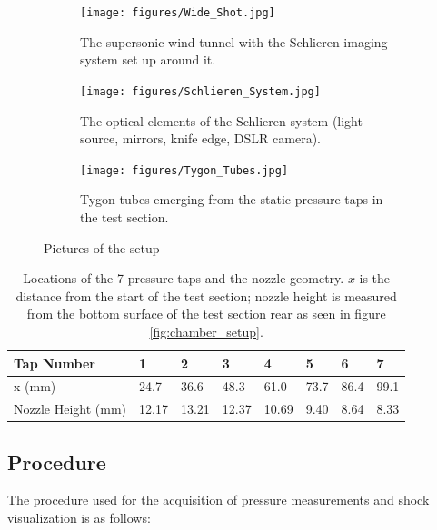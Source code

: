 \documentclass[runningheads]{llncs}
\begin{document}
\begin{figure}
    \centering
    \begin{subfigure}[b]{0.3\textwidth}
        \centering
        \texttt{[image: figures/Wide\_Shot.jpg]}
        \caption{The supersonic wind tunnel with the Schlieren imaging system set up around it.}
        \label{fig:setup_1}
    \end{subfigure}
    \hfill
    \begin{subfigure}[b]{0.3\textwidth}
        \centering
        \texttt{[image: figures/Schlieren\_System.jpg]}
        \caption{The optical elements of the Schlieren system (light source, mirrors, knife edge, DSLR camera).}
        \label{fig:setup_2}
    \end{subfigure}
    \hfill
    \begin{subfigure}[b]{0.3\textwidth}
        \centering
        \texttt{[image: figures/Tygon\_Tubes.jpg]}
        \caption{Tygon tubes emerging from the static pressure taps in the test section.}
        \label{fig:setup_3}
    \end{subfigure}
    \caption{Pictures of the setup}
    \label{fig:setup_pictures}
\end{figure}

\begin{table}[h]
    \centering
    \begin{tabular}{p{3cm}p{1cm}p{1cm}p{1cm}p{1cm}p{1cm}p{1cm}p{1cm}}
        \toprule
        Tap Number & 1 & 2 & 3 & 4 & 5 & 6 & 7\\
        \midrule
        x (mm) & 24.7 & 36.6 & 48.3 & 61.0 & 73.7 & 86.4 & 99.1\\
        Nozzle Height (mm) & 12.17 & 13.21 & 12.37 & 10.69 & 9.40 & 8.64 & 8.33\\
        \bottomrule
    \end{tabular}
    \caption{Locations of the 7 pressure-taps and the nozzle geometry. $x$ is the distance from the start of the test section; nozzle height is measured from the bottom surface of the test section rear as seen in figure \ref{fig:chamber_setup}.}
    \label{tab:tap_locations}
\end{table}

\subsection{Procedure}\label{sec:procedure}

The procedure used for the acquisition of pressure measurements and shock visualization is as follows:
\end{document}
